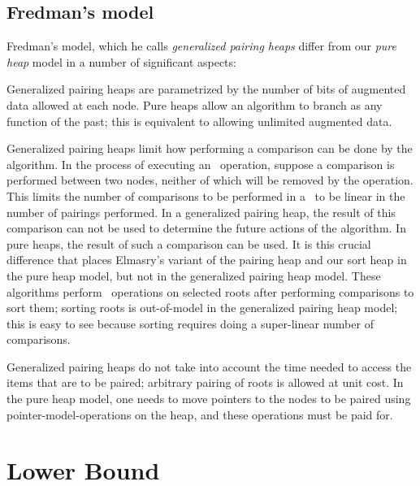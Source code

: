 \begin{fullonly}
\section{Fredman's model} 

Fredman's model, which he calls \emph{generalized pairing heaps} differ from our \emph{pure heap} model in a number of significant aspects:

\shortfull{}{\item} Generalized pairing heaps are parametrized by the number of bits of augmented data allowed at each node. Pure heaps allow an algorithm to branch as any function of the past; this is equivalent to allowing unlimited augmented data.

\shortfull{}{\item} Generalized pairing heaps limit how performing a comparison can be done by the algorithm. In the process of executing an \opEm\ operation, suppose a comparison is performed between two nodes, neither of which will be removed by the operation. This limits the number of comparisons to be performed in a \opEm\ to be linear in the number of pairings performed. In a generalized pairing heap, the result of this comparison can not be used to determine the future actions of the algorithm. In pure heaps, the result of such a comparison can be used. It is this crucial difference that places Elmasry's variant of the pairing heap and our sort heap in the pure heap model, but not in the generalized pairing heap model. These algorithms perform \opDc\ operations on selected roots after performing comparisons to sort them; sorting roots is out-of-model in the generalized pairing heap model; this is easy to see because sorting requires doing a super-linear number of comparisons. 

\shortfull{}{\item} Generalized pairing heaps do not take into account the time needed to access the items that are to be paired; arbitrary pairing of roots is allowed at unit cost. In the pure heap model, one needs to move pointers to the nodes to be paired using pointer-model-operations on the heap, and these operations must be paid for.
\end{fullonly}

\section{Lower Bound} 

